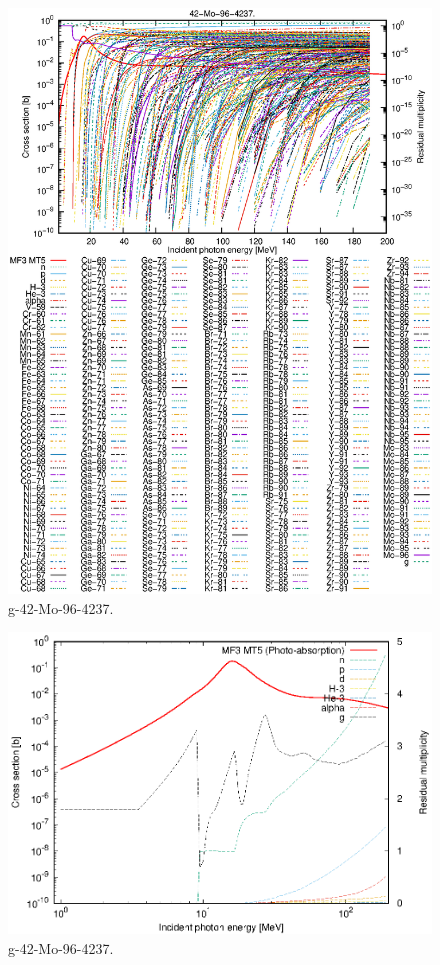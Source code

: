\begin{figure}
 \includegraphics[width=\linewidth]{eps/g_42-Mo-96_4237.eps}
  \caption{g-42-Mo-96-4237.}
\end{figure}
\newpage \clearpage

\begin{figure}
 \includegraphics[width=\linewidth]{eps-log/g_42-Mo-96_4237.eps}
 \caption{g-42-Mo-96-4237.}
\end{figure}
\newpage \clearpage

